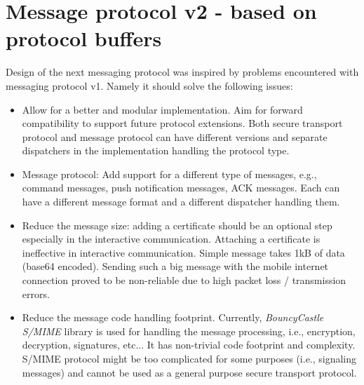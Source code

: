 \documentclass[a4paper,10pt]{article}
\begin{document}
\section{Message protocol v2 - based on protocol buffers}
Design of the next messaging protocol was inspired by problems encountered with messaging protocol v1. 
Namely it should solve the following issues:

\begin{itemize}
 \item Allow for a better and modular implementation. Aim for forward compatibility to support future protocol extensions.
 Both secure transport protocol and message protocol can have different versions and separate dispatchers in the implementation
 handling the protocol type.
 \item Message protocol: Add support for a different type of messages, e.g., command messages, push notification messages, ACK messages. Each
 can have a different message format and a different dispatcher handling them.
 \item Reduce the message size: adding a certificate should be an optional step especially in the interactive communication. Attaching a 
 certificate is ineffective in interactive communication. Simple message takes 1kB of data (base64 encoded). Sending such a big message
 with the mobile internet connection proved to be non-reliable due to high packet loss / transmission errors. 
 \item Reduce the message code handling footprint. Currently, {\it BouncyCastle S/MIME} library is used for handling the message 
 processing, i.e., encryption, decryption, signatures, etc... It has non-trivial code footprint and complexity. S/MIME protocol
 might be too complicated for some purposes (i.e., signaling messages) and cannot be used as a general purpose secure transport protocol.
\end{itemize}
\end{document}
